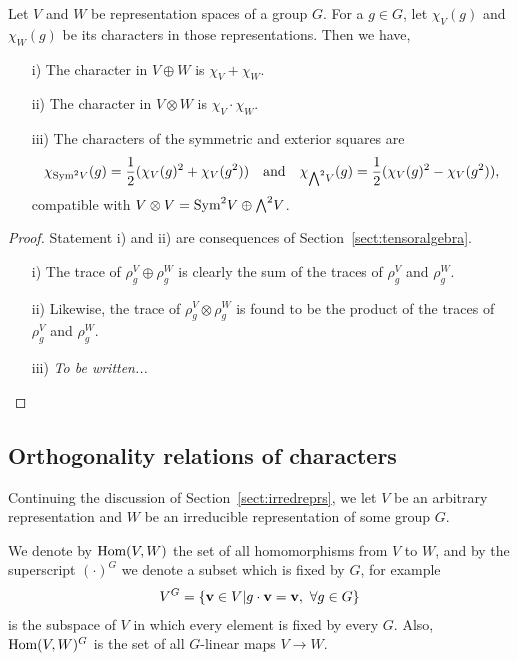 \begin{proposition}\label{prop:charplustimes}
	Let $V$ and $W$ be representation spaces of a group $G$. For a $g \in G$, let $\chi_V(g)$ and $\chi_W(g)$ be its characters in those representations. Then we have,
	\begin{enumerate}
		\item[i)] The character in $V \oplus W$ is $\chi_V+\chi_W$.
		\item[ii)] The character in $V \otimes W$ is $\chi_V \cdot \chi_W$.
		\item[iii)] The characters of the symmetric and exterior squares are \begin{align*}
			\chi_{\text{Sym}^2 V}(g) = \frac{1}{2}(\chi_V(g)^2 + \chi_V(g^2)) \quad \text{and} \quad \chi_{{\bigwedge}^2 V}(g) = \frac{1}{2}(\chi_V(g)^2 - \chi_V(g^2)),
		\end{align*} compatible with $V \otimes V = \text{Sym}^2 V \oplus {\bigwedge}^2 V$.
	\end{enumerate}
\end{proposition}
\begin{proof}
	Statement i) and ii) are consequences of Section~\ref{sect:tensoralgebra}. 
	\begin{enumerate}
		\item[i)] The trace of $\rho_g^V \oplus \rho_g^W$ is clearly the sum of the traces of $\rho_g^V$ and $\rho_g^W$.
		\item[ii)] Likewise, the trace of $\rho_g^V \otimes \rho_g^W$ is found to be the product of the traces of $\rho_g^V$ and $\rho_g^W$.
		\item[iii)] \textit{To be written...} \qedhere
	\end{enumerate}
\end{proof}


\subsection{Orthogonality relations of characters}

Continuing the discussion of Section~\ref{sect:irredreprs}, we let $V$ be an arbitrary representation and $W$ be an irreducible representation of some group $G$. 

We denote by $\text{Hom} (V,W)$ the set of all homomorphisms from $V$ to $W$, and by the superscript $(\cdot) ^G$ we denote a subset which is fixed by $G$, for example 
\begin{align}\label{eq:defVG}
	V^G = \left\lbrace \vvec \in V \middle\vert g\cdot \vvec = \vvec, \ \forall g \in G \right\rbrace
\end{align} 
is the subspace of $V$ in which every element is fixed by every $G$. Also, $\text{Hom}(V,W)^G$ is the set of all $G$-linear maps $V \rightarrow W$.

